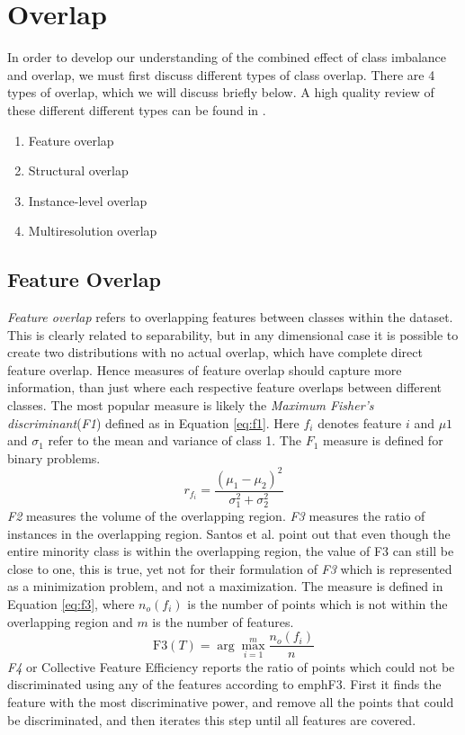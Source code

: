 \section{Overlap}
In order to develop our understanding of the combined effect of class imbalance and overlap, we must first discuss different types of class overlap. There are 4 types of overlap, which we will discuss briefly below. A high quality review of these different different types can be found in \cite{santos2022joint}. 
\begin{enumerate}
    \item Feature overlap
    \item Structural overlap
    \item Instance-level overlap
    \item Multiresolution overlap 
\end{enumerate}

\subsection{Feature Overlap}
\emph{Feature overlap} refers to overlapping features between classes within the dataset. 
This is clearly related to separability, but in any dimensional case it is possible to create two distributions with no actual overlap, which have complete direct feature overlap. Hence measures of feature overlap should capture more information, than just where each respective feature overlaps between different classes.  %
The most popular measure is likely the \emph{Maximum Fisher's discriminant}(\emph{F1}) defined as in Equation \ref{eq:f1}. Here $f_i$ denotes feature $i$ and $\mu1$  and $\sigma_1$ refer to the mean and variance of class 1. The $F_1$ measure is defined for binary problems.  
\begin{equation}
    \label{eq:f1}
    r_{f_{i}} = \frac{(\mu_1-\mu_2)^2}{\sigma^2_1+\sigma^2_2}
\end{equation}
\emph{F2} measures the volume of the overlapping region. \emph{F3} measures the ratio of instances in the overlapping region. Santos et al. \cite{santos2022joint} point out that even though the entire minority class is within the overlapping region, the value of F3 can still be close to one, this is true, yet not for their formulation of \emph{F3} which is represented as a minimization problem, and not a maximization.  
The measure is defined in Equation \ref{eq:f3}, where $n_o(f_i)$ is the number of points which is not within the overlapping region and $m$ is the number of features.
\begin{equation}
    \label{eq:f3}
    \text{F3}(T)=\arg\max_{i=1}^{m} \frac{n_o(f_i)}{n}
\end{equation}
\emph{F4} or Collective Feature Efficiency reports the ratio of points which could not be discriminated using any of the features according to emph{F3}. First it finds the feature with the most discriminative power, and remove all the points that could be discriminated, and then iterates this step until all features are covered.  

